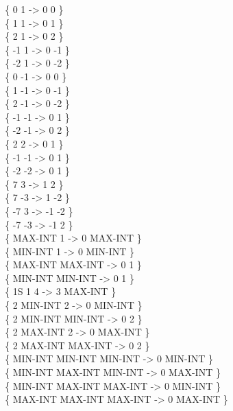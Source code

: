 \begin{tt}
\{       0              1  ->  0       0 \} \\
\{       1              1  ->  0       1 \} \\
\{       2              1  ->  0       2 \} \\
\{      -1              1  ->  0      -1 \} \\
\{      -2              1  ->  0      -2 \} \\
\{       0             -1  ->  0       0 \} \\
\{       1             -1  ->  0      -1 \} \\
\{       2             -1  ->  0      -2 \} \\
\{      -1             -1  ->  0       1 \} \\
\{      -2             -1  ->  0       2 \} \\
\{       2              2  ->  0       1 \} \\
\{      -1             -1  ->  0       1 \} \\
\{      -2             -2  ->  0       1 \} \\
\{       7              3  ->  1       2 \} \\
\{       7             -3  ->  1      -2 \} \\
\{      -7              3  -> -1      -2 \} \\
\{      -7             -3  -> -1       2 \} \\
\{ MAX-INT              1  ->  0 MAX-INT \} \\
\{ MIN-INT              1  ->  0 MIN-INT \} \\
\{ MAX-INT        MAX-INT  ->  0       1 \} \\
\{ MIN-INT        MIN-INT  ->  0       1 \} \\
\{      1S       1                 4  ->  3 MAX-INT \} \\
\{       2 MIN-INT        2  ->  0 MIN-INT \} \\
\{       2 MIN-INT  MIN-INT  ->  0       2 \} \\
\{       2 MAX-INT        2  ->  0 MAX-INT \} \\
\{       2 MAX-INT  MAX-INT  ->  0       2 \} \\
\{ MIN-INT MIN-INT  MIN-INT  ->  0 MIN-INT \} \\
\{ MIN-INT MAX-INT  MIN-INT  ->  0 MAX-INT \} \\
\{ MIN-INT MAX-INT  MAX-INT  ->  0 MIN-INT \} \\
\{ MAX-INT MAX-INT  MAX-INT  ->  0 MAX-INT \}


\end{tt}
